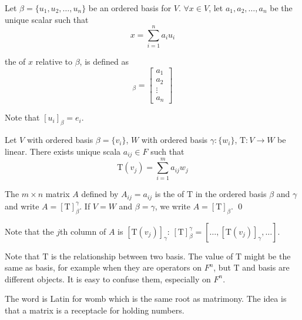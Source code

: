 \begin{definition}
	Let $\beta = \{u_1, u_2, \dots, u_n \}$ be an ordered basis for $V$. $\forall x \in V$, let $a_1, a_2, \dots, a_n$ be the unique scalar such that
	\begin{equation*}
		x = \sum_{i=1}^n a_i u_i
	\end{equation*}
	
	the   of $x$ relative to $\beta$, is defined as 
	\begin{equation}
		[x]_\beta = \left [
		\begin{matrix}
		a_1 \\
		a_2 \\
		\vdots \\
		a_n
		\end{matrix}
		\right ]
	\end{equation}
	
	Note that $[u_i]_\beta = e_i$.
\end{definition}

\begin{definition}
	Let $V$ with ordered basis $\beta=\{ v_i \}$, $W$ with ordered basis $\gamma:\{w_i\}$, $\mathrm{T}:V \rightarrow W$ be linear. There exists unique scala $a_{ij} \in F$ such that
	\begin{equation}
		\mathrm{T}(v_j) = \sum_{i=1}^m a_{ij} w_j
	\end{equation}
	
	The $m \times n$ matrix $A$ defined by $A_{ij}=a_{ij}$ is the   of $\mathrm{T}$ in the ordered basis $\beta$ and $\gamma$ and write $A=[\mathrm{T}]_\beta^\gamma$. If $V = W$ and $\beta = \gamma$, we write $A=[\mathrm{T}]_\beta$.
	\qed
\end{definition}

	Note that the $j$th column of $A$ is $[\mathrm{T}(v_j)]_\gamma$: $[\mathrm{T}]_\beta^\gamma = [\dots, [\mathrm{T}(v_j)]_\gamma, \dots ]$.
	
	Note that $\mathrm{T}$ is the relationship between two basis. The value of $\mathrm{T}$ might be the same as basis, for example when they are operators on $F^n$, but $\mathrm{T}$ and basis are different objects. It is easy to confuse them, especially on $F^n$.
	

\begin{definition}
  The word  is Latin for womb which is the same root as matrimony. The idea is that a matrix is a receptacle for holding numbers.   
\end{definition}



